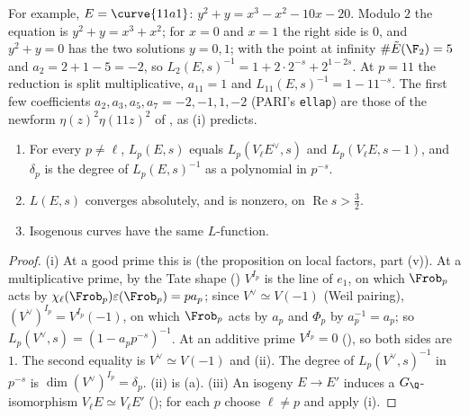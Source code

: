 For example, $E=\curve{11a1}$: $y^2+y=x^3-x^2-10x-20$. Modulo $2$ the equation is $y^2+y=x^3+x^2$; for $x=0$ and $x=1$ the right side is $0$, and $y^2+y=0$ has the two
solutions $y=0,1$; with the point at infinity $\#\tilde E(\F_2)=5$ and $a_2=2+1-5=-2$, so $L_2(E,s)^{-1}=1+2\cdot2^{-s}+2^{1-2s}$. At $p=11$ the reduction is split
multiplicative, $a_{11}=1$ and $L_{11}(E,s)^{-1}=1-11^{-s}$. The first few coefficients $a_2,a_3,a_5,a_7=-2,-1,1,-2$ (PARI's \texttt{ellap}) are those of the newform
$\eta(z)^2\eta(11z)^2$ of , as (i) predicts.

\begin{proposition}\label{prop:lfunctions:LE}
\begin{enumerate}[label=(\roman*)]
\item For every $p\ne\ell$, $L_p(E,s)$ equals $L_p(V_\ell E^\vee,s)$ and $L_p(V_\ell E,s-1)$, and $\delta_p$ is the degree of $L_p(E,s)^{-1}$ as a polynomial in $p^{-s}$.
\item $L(E,s)$ converges absolutely, and is nonzero, on $\operatorname{Re}s>\frac32$.
\item Isogenous curves have the same $L$-function.
\end{enumerate}
\end{proposition}

\begin{proof}
(i) At a good prime this is  (the proposition on local factors, part (v)). At a multiplicative prime, by the Tate shape () $V^{I_p}$ is the
line of $e_1$, on which $\Frob_p$ acts by $\chi_\ell(\Frob_p)\varepsilon(\Frob_p)=pa_p$; since $V^\vee\simeq V(-1)$ (Weil pairing), $(V^\vee)^{I_p}=V^{I_p}(-1)$, on which $\Frob_p$ acts by $a_p$
and $\Phi_p$ by $a_p^{-1}=a_p$; so $L_p(V^\vee,s)=(1-a_pp^{-s})^{-1}$. At an additive prime $V^{I_p}=0$ (), so both sides are $1$. The second equality is
$V^\vee\simeq V(-1)$ and (ii). The degree of $L_p(V^\vee,s)^{-1}$ in $p^{-s}$ is $\dim(V^\vee)^{I_p}=\delta_p$. (ii) is
(a). (iii) An isogeny $E\to E'$ induces a $G_\Q$-isomorphism $V_\ell E\simeq V_\ell E'$ (); for each $p$ choose $\ell\ne p$ and apply (i).
\end{proof}

